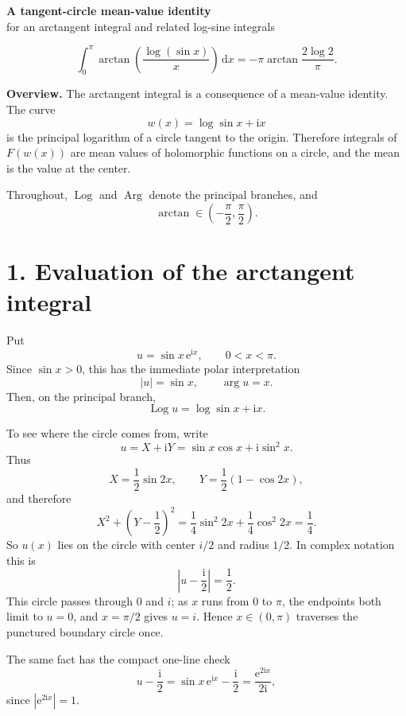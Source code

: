 \documentclass[12pt]{article}
\newcommand{\dd}{\,\mathrm{d}}
\newcommand{\ii}{\mathrm{i}}
\newcommand{\e}{\mathrm{e}}
\newcommand{\Log}{\operatorname{Log}}
\newcommand{\Arg}{\operatorname{Arg}}
\begin{document}
\begin{center}
{\Large\bfseries A tangent-circle mean-value identity}\\[0.35em]
{\large for an arctangent integral and related log-sine integrals}
\end{center}

\[
\boxed{\displaystyle
\int_0^\pi
\arctan\!\left(\frac{\log(\sin x)}{x}\right)\dd x
=-\pi\arctan\frac{2\log2}{\pi}.}
\]

\textbf{Overview.}
The arctangent integral is a consequence of a mean-value identity. The curve
\[
w(x)=\log\sin x+\ii x
\]
is the principal logarithm of a circle tangent to the origin. Therefore
integrals of \(F(w(x))\) are mean values of holomorphic functions on a
circle, and the mean is the value at the center.

Throughout, \(\Log\) and \(\Arg\) denote the principal branches, and
\[
\arctan\in\left(-\frac{\pi}{2},\frac{\pi}{2}\right).
\]

\section*{1. Evaluation of the arctangent integral}

Put
\[
u=\sin x\,\e^{\ii x},\qquad 0<x<\pi.
\]
Since \(\sin x>0\), this has the immediate polar interpretation
\[
|u|=\sin x,\qquad \arg u=x.
\tag{1}
\]
Then, on the principal branch,
\[
\Log u=\log\sin x+\ii x.
\]

To see where the circle comes from, write
\[
u=X+\ii Y
=\sin x\cos x+\ii\sin^2x.
\]
Thus
\[
X=\frac12\sin2x,\qquad
Y=\frac12(1-\cos2x),
\]
and therefore
\[
X^2+\left(Y-\frac12\right)^2
=\frac14\sin^2 2x+\frac14\cos^2 2x
=\frac14.
\]
So \(u(x)\) lies on the circle with center \(i/2\) and radius \(1/2\).
In complex notation this is
\[
\left|u-\frac{\ii}{2}\right|=\frac12.
\tag{2}
\]
This circle passes through \(0\) and \(i\); as \(x\) runs from \(0\) to
\(\pi\), the endpoints both limit to \(u=0\), and \(x=\pi/2\) gives
\(u=i\). Hence \(x\in(0,\pi)\) traverses the punctured boundary circle
once.

The same fact has the compact one-line check
\[
u-\frac{\ii}{2}
=\sin x\,\e^{\ii x}-\frac{\ii}{2}
=\frac{\e^{2\ii x}}{2\ii},
\]
since \(|\e^{2\ii x}|=1\).

\begin{center}
\end{center}
\end{document}
